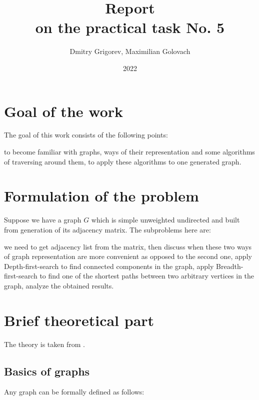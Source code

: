 \documentclass[12pt, bachelor, substylefile = algo_title.rtx]{disser}
\theoremstyle{definition}
\begin{document}
\title{Report\\
on the practical task No. 5}


\author{Dmitry Grigorev, Maximilian Golovach}
\sastatus {}

\date{2022}

\maketitle
\section{Goal of the work}
The goal of this work consists of the following points:
\begin{outline}
\1 to become familiar with graphs, ways of their representation and some algorithms of traversing around them,
\1 to apply these algorithms to one generated graph.
\end{outline}

\section{Formulation of the problem}
Suppose we have a graph $G$ which is simple unweighted undirected and built from generation of its adjacency matrix. The subproblems here are:
\begin{outline}[enumerate]
\1 we need to get adjacency list from the matrix,
\1 then discuss when these two ways of graph representation are more convenient as opposed to the second one,
\1 apply Depth-first-search to find connected components in the graph,
\1 apply Breadth-first-search to find one of the shortest paths between two arbitrary vertices in the graph,
\1 analyze the obtained results.
\end{outline}

\section{Brief theoretical part}
The theory is taken from \cite{erciyes18}.

\subsection{Basics of graphs}
Any graph can be formally defined as follows:
\end{document}
